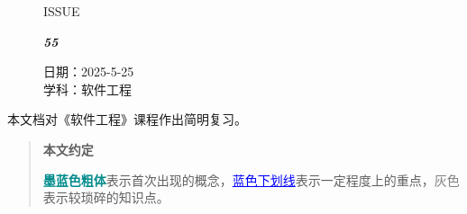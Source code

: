 \documentclass[UTF8]{ctexart}
\newcommand\Black[1]{\textcolor[gray]{0.3}{#1}}
\newcommand\Brown[1]{\textcolor[HTML]{998A4E}{#1}}
\newcommand\Point[1]{\textcolor{blue}{\uline{#1}}} %
\newcommand\IssueNumber{55}
\newcommand\Date{2025-5-25}
\newcommand\Subject{软件工程}
\begin{document}
\begin{figure}[H]
\hspace{1cm}
\begin{minipage}[t]{0.3\textwidth}
\centering
    \Brown{\Genshin ISSUE}

    \vspace{-0.6cm}
    \Huge \Issue\slshape\bfseries\Black{\IssueNumber}
\end{minipage}
\hfill
\begin{minipage}[t]{0.3\textwidth}
\centering
\vspace{-0.1cm}
    \Brown{日期：\Date} \\
    \Brown{学科：\Subject} \\
\end{minipage}
\hspace{0.8cm}
\end{figure}

{\color{darkcyan} 本文档对《软件工程》课程作出简明复习。}

\begin{quote}\small
\begin{center}
    \bfseries 本文约定
\end{center}
    \textcolor{darkcyan}{\textbf{墨蓝色粗体}}表示首次出现的概念，\Point{蓝色下划线}表示一定程度上的重点，\textcolor{gray}{灰色}表示较琐碎的知识点。
\end{quote}

\tableofcontents
{}
\BgThispage
\newpage
\end{document}
